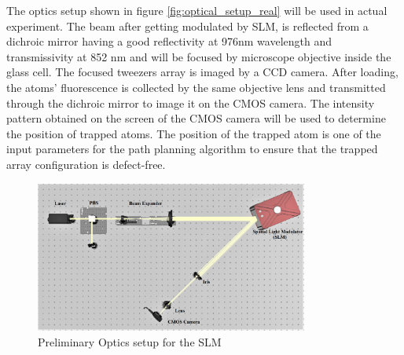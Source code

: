 The optics setup shown in figure \ref{fig:optical_setup_real} will be used in actual experiment. The beam after getting modulated by SLM, is reflected from a dichroic mirror having a good reflectivity at 976nm wavelength and transmissivity at 852 nm and will be focused by microscope objective inside the glass cell. The focused tweezers array is imaged by a CCD camera. After loading, the atoms' fluorescence is collected by the same objective lens and transmitted through the dichroic mirror to image it on the CMOS camera. The intensity pattern obtained on the screen of the CMOS camera will be used to determine the position of trapped atoms. The position of the trapped atom is one of the input parameters for the path planning algorithm to ensure that the trapped array configuration is defect-free.\\


\begin{figure}[H]
\centering
\includegraphics[width=0.8\textwidth]{img/optical_setup.jpg}
\onehalfspacing
\caption{Preliminary Optics setup for the SLM}
\label{fig:optical_setup}
\end{figure}

